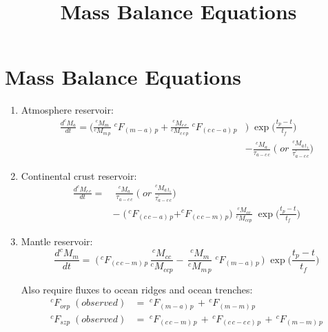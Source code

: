 \documentclass[14pt]{article}
\title{\textbf{Mass Balance Equations}}
\date{}
\begin{document}
\section*{Mass Balance Equations}
\thispagestyle{empty}

\begin{enumerate}
  \item Atmosphere reservoir:
  \begin{equation*}
   \begin{split}
    \frac{d ^cM_a}{d t} = \Big(\frac{^cM_m}{^cM_{m\,p}}\; ^cF_{(m-a)\,p} + \frac{^cM_{c\,c}}{^cM_{c\,c\,p}}\; ^cF_{(c\,c-a)\,p}&\Big)\; \exp\Big(\frac{t_p - t}{t_f}\Big) \\ 
    &- \frac{^cM_{a}}{\tau_{a - c\,c}} \; \Big(\; or \; \frac{^cM_{a\,t_{1}}}{\tau^{'}_{a - c\,c}} \Big)
    \end{split}
  \end{equation*}
  \item Continental crust reservoir:
  \begin{equation*}
   \begin{split}
    \frac{d ^cM_{c\,c}}{d t} = &\;\frac{^cM_{a}}{\tau_{a - c\,c}} \; \Big(\;or \; \frac{^cM_{a\,t_{1}}}{\tau^{'}_{a - c\,c}} \Big) \\ 
    &- \; \Big( \,^cF_{(c\,c-a)\,p} + ^cF_{(c\,c-m)\,p} \Big) \; \frac{^cM_{cc}}{^cM_{ccp}} \; \exp\Big(\frac{t_p - t}{t_f}\Big)
   \end{split} 
  \end{equation*}
  
  \item Mantle reservoir:
  \begin{equation*}
    \frac{d ^cM_{m}}{d t} = \;\Big( \,^cF_{(c\,c-m)\,p} \, \frac{^cM_{cc}}{^cM_{ccp}} - \, \frac{^cM_m}{^cM_{m\,p}}\; ^cF_{(m-a)\,p} \, \Big) \; \exp\Big(\frac{t_p - t}{t_f}\Big)
  \end{equation*}  
  
  Also require fluxes to ocean ridges and ocean trenches:
  \begin{align*}
    ^cF_{orp}\;(observed) &= \;^cF_{(m-a)\,p} \,+ \,^cF_{(m-m)\,p} \\
    ^cF_{szp}\;(observed) &= \;^cF_{(c\,c-m)\,p} \,+ \,^cF_{(c\,c-c\,c)\,p} \, + \,^cF_{(m-m)\,p}
  \end{align*}
\end{enumerate}
\end{document}
